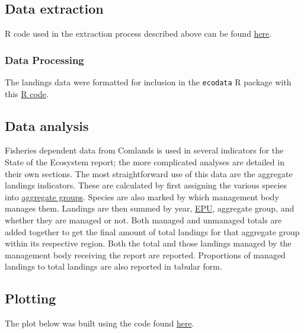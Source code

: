 \documentclass[
]{book}
\begin{document}
\hypertarget{data-extraction-18}{%
\subsection{Data extraction}\label{data-extraction-18}}

R code used in the extraction process described above can be found \href{https://github.com/NOAA-EDAB/tech-doc/tree/master/R/stored_scripts/landings_extraction.R}{here}.

\hypertarget{data-processing-15}{%
\subsubsection{Data Processing}\label{data-processing-15}}

The landings data were formatted for inclusion in the \texttt{ecodata} R package with this \href{https://github.com/NOAA-EDAB/ecodata/blob/master/data-raw/get_comdat.R}{R code}.

\hypertarget{data-analysis-19}{%
\subsection{Data analysis}\label{data-analysis-19}}

Fisheries dependent data from Comlands is used in several indicators for the State of the Ecosystem report; the more complicated analyses are detailed in their own sections. The most straightforward use of this data are the aggregate landings indicators. These are calculated by first assigning the various species into \protect\hyperlink{aggroups}{aggregate groups}. Species are also marked by which management body manages them. Landings are then summed by year, \protect\hyperlink{epu}{EPU}, aggregate group, and whether they are managed or not. Both managed and unmanaged totals are added together to get the final amount of total landings for that aggregate group within its respective region. Both the total and those landings managed by the management body receiving the report are reported. Proportions of managed landings to total landings are also reported in tabular form.

\hypertarget{plotting-14}{%
\subsection{Plotting}\label{plotting-14}}

The plot below was built using the code found
\href{https://github.com/NOAA-EDAB/ecodata/blob/master/chunk-scripts/human_dimensions.Rmd-comm_landings.R}{here}.
\end{document}
